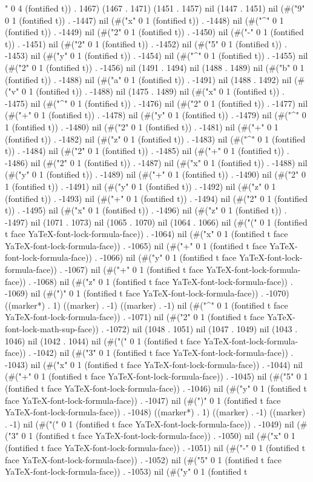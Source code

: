 " 0 4 (fontified t)) . 1467) (1467 . 1471) (1451 . 1457) nil (1447 . 1451) nil (#("9" 0 1 (fontified t)) . -1447) nil (#("x" 0 1 (fontified t)) . -1448) nil (#("^" 0 1 (fontified t)) . -1449) nil (#("2" 0 1 (fontified t)) . -1450) nil (#("-" 0 1 (fontified t)) . -1451) nil (#("2" 0 1 (fontified t)) . -1452) nil (#("5" 0 1 (fontified t)) . -1453) nil (#("y" 0 1 (fontified t)) . -1454) nil (#("^" 0 1 (fontified t)) . -1455) nil (#("2" 0 1 (fontified t)) . -1456) nil (1491 . 1494) nil (1488 . 1489) nil (#("b" 0 1 (fontified t)) . -1488) nil (#("a" 0 1 (fontified t)) . -1491) nil (1488 . 1492) nil (#("v" 0 1 (fontified t)) . -1488) nil (1475 . 1489) nil (#("x" 0 1 (fontified t)) . -1475) nil (#("^" 0 1 (fontified t)) . -1476) nil (#("2" 0 1 (fontified t)) . -1477) nil (#("+" 0 1 (fontified t)) . -1478) nil (#("y" 0 1 (fontified t)) . -1479) nil (#("^" 0 1 (fontified t)) . -1480) nil (#("2" 0 1 (fontified t)) . -1481) nil (#("+" 0 1 (fontified t)) . -1482) nil (#("z" 0 1 (fontified t)) . -1483) nil (#("^" 0 1 (fontified t)) . -1484) nil (#("2" 0 1 (fontified t)) . -1485) nil (#("+" 0 1 (fontified t)) . -1486) nil (#("2" 0 1 (fontified t)) . -1487) nil (#("x" 0 1 (fontified t)) . -1488) nil (#("y" 0 1 (fontified t)) . -1489) nil (#("+" 0 1 (fontified t)) . -1490) nil (#("2" 0 1 (fontified t)) . -1491) nil (#("y" 0 1 (fontified t)) . -1492) nil (#("z" 0 1 (fontified t)) . -1493) nil (#("+" 0 1 (fontified t)) . -1494) nil (#("2" 0 1 (fontified t)) . -1495) nil (#("x" 0 1 (fontified t)) . -1496) nil (#("z" 0 1 (fontified t)) . -1497) nil (1071 . 1073) nil (1065 . 1070) nil (1064 . 1066) nil (#("(" 0 1 (fontified t face YaTeX-font-lock-formula-face)) . -1064) nil (#("x" 0 1 (fontified t face YaTeX-font-lock-formula-face)) . -1065) nil (#("+" 0 1 (fontified t face YaTeX-font-lock-formula-face)) . -1066) nil (#("y" 0 1 (fontified t face YaTeX-font-lock-formula-face)) . -1067) nil (#("+" 0 1 (fontified t face YaTeX-font-lock-formula-face)) . -1068) nil (#("z" 0 1 (fontified t face YaTeX-font-lock-formula-face)) . -1069) nil (#(")" 0 1 (fontified t face YaTeX-font-lock-formula-face)) . -1070) ((marker*) . 1) ((marker) . -1) ((marker) . -1) nil (#("^" 0 1 (fontified t face YaTeX-font-lock-formula-face)) . -1071) nil (#("2" 0 1 (fontified t face YaTeX-font-lock-math-sup-face)) . -1072) nil (1048 . 1051) nil (1047 . 1049) nil (1043 . 1046) nil (1042 . 1044) nil (#("(" 0 1 (fontified t face YaTeX-font-lock-formula-face)) . -1042) nil (#("3" 0 1 (fontified t face YaTeX-font-lock-formula-face)) . -1043) nil (#("x" 0 1 (fontified t face YaTeX-font-lock-formula-face)) . -1044) nil (#("+" 0 1 (fontified t face YaTeX-font-lock-formula-face)) . -1045) nil (#("5" 0 1 (fontified t face YaTeX-font-lock-formula-face)) . -1046) nil (#("y" 0 1 (fontified t face YaTeX-font-lock-formula-face)) . -1047) nil (#(")" 0 1 (fontified t face YaTeX-font-lock-formula-face)) . -1048) ((marker*) . 1) ((marker) . -1) ((marker) . -1) nil (#("(" 0 1 (fontified t face YaTeX-font-lock-formula-face)) . -1049) nil (#("3" 0 1 (fontified t face YaTeX-font-lock-formula-face)) . -1050) nil (#("x" 0 1 (fontified t face YaTeX-font-lock-formula-face)) . -1051) nil (#("-" 0 1 (fontified t face YaTeX-font-lock-formula-face)) . -1052) nil (#("5" 0 1 (fontified t face YaTeX-font-lock-formula-face)) . -1053) nil (#("y" 0 1 (fontified t 